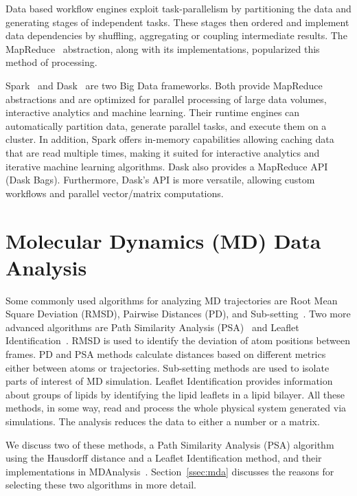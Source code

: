 \label{sec:task-par}

Data based workflow engines exploit task-parallelism by partitioning the data and generating stages of independent tasks.
These stages then ordered and implement data dependencies by shuffling, aggregating or coupling intermediate results.
The MapReduce~\cite{dean2004mapreduce} abstraction, along with its implementations, popularized this method of processing.

Spark~\cite{zaharia2010spark} and Dask~\cite{rocklin2015dask} are two Big Data frameworks.
Both provide MapReduce abstractions and are optimized for parallel processing of large data volumes, interactive analytics and machine learning.
Their runtime engines can automatically partition data, generate parallel tasks, and execute them on a cluster.
In addition, Spark offers in-memory capabilities allowing caching data that are read multiple times, making it suited for interactive analytics and iterative machine learning algorithms.
Dask also provides a MapReduce API (Dask Bags).
Furthermore, Dask's API is more versatile, allowing custom workflows and parallel vector/matrix computations.

\section{Molecular Dynamics (MD) Data Analysis}
Some commonly used algorithms for analyzing MD trajectories are Root Mean Square Deviation (RMSD), Pairwise Distances (PD), and Sub-setting~\cite{mura2014biomolecules}.
Two more advanced algorithms are Path Similarity Analysis (PSA)~\cite{seyler2015path} and Leaflet Identification~\cite{michaud2011mdanalysis}.
RMSD is used to identify the deviation of atom positions between frames.
PD and PSA methods calculate distances based on different metrics either between atoms or trajectories.
Sub-setting methods are used to isolate parts of interest of MD simulation.
Leaflet Identification provides information about groups of lipids by identifying the lipid leaflets in a lipid bilayer.
All these methods, in some way, read and process the whole physical system generated via simulations.
The analysis reduces the data to either a number or a matrix.

We discuss two of these methods, a Path Similarity Analysis (PSA) algorithm using the Hausdorff distance and a Leaflet Identification method, and their implementations in MDAnalysis~\cite{michaud2011mdanalysis,gowers2016mdanalysis}.
Section~\ref{ssec:mda} discusses the reasons for selecting these two algorithms in more detail.

